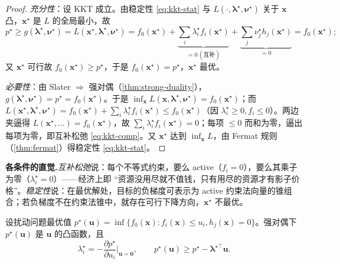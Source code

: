 \begin{proof}
\emph{充分性}：设 KKT 成立。由稳定性 \cref{eq:kkt-stat} 与 $L(\cdot,\boldsymbol\lambda^\star,\boldsymbol\nu^\star)$ 关于 $\mathbf x$ 凸，$\mathbf x^\star$ 是 $L$ 的全局最小，故
\[
  p^\star\ge g(\boldsymbol\lambda^\star,\boldsymbol\nu^\star)=L(\mathbf x^\star,\boldsymbol\lambda^\star,\boldsymbol\nu^\star)=f_0(\mathbf x^\star)+\underbrace{\textstyle\sum_i\lambda_i^\star f_i(\mathbf x^\star)}_{=0\,(\text{互补})}+\underbrace{\textstyle\sum_j\nu_j^\star h_j(\mathbf x^\star)}_{=0}=f_0(\mathbf x^\star);
\]
又 $\mathbf x^\star$ 可行故 $f_0(\mathbf x^\star)\ge p^\star$，于是 $f_0(\mathbf x^\star)=p^\star$，$\mathbf x^\star$ 最优。

\emph{必要性}：由 Slater $\Rightarrow$ 强对偶（\cref{thm:strong-duality}），$g(\boldsymbol\lambda^\star,\boldsymbol\nu^\star)=p^\star=f_0(\mathbf x^\star)$。于是 $\inf_{\mathbf x}L(\mathbf x,\boldsymbol\lambda^\star,\boldsymbol\nu^\star)=f_0(\mathbf x^\star)$；而 $L(\mathbf x^\star,\boldsymbol\lambda^\star,\boldsymbol\nu^\star)=f_0(\mathbf x^\star)+\sum_i\lambda_i^\star f_i(\mathbf x^\star)\le f_0(\mathbf x^\star)$（因 $\lambda_i^\star\ge0,f_i\le0$）。两边夹逼得 $L(\mathbf x^\star,\dots)=f_0(\mathbf x^\star)$，故 $\sum_i\lambda_i^\star f_i(\mathbf x^\star)=0$；每项 $\le0$ 而和为零，逼出每项为零，即互补松弛 \cref{eq:kkt-comp}。又 $\mathbf x^\star$ 达到 $\inf_{\mathbf x}L$，由 Fermat 规则（\cref{thm:fermat}）得稳定性 \cref{eq:kkt-stat}。
\end{proof}

\noindent\textbf{各条件的直觉.}\;\emph{互补松弛}说：每个不等式约束，要么 active（$f_i=0$），要么其乘子为零（$\lambda_i^\star=0$）——经济上即 “资源没用尽就不值钱，只有用尽的资源才有影子价格”。\emph{稳定性}说：在最优解处，目标的负梯度可表示为 active 约束法向量的锥组合；若负梯度不在约束法锥中，就存在可行下降方向，$\mathbf x^\star$ 不最优。

\begin{theorem}\label{thm:sensitivity}
设扰动问题最优值 $p^\star(\mathbf u)=\inf\{f_0(\mathbf x):f_i(\mathbf x)\le u_i,h_j(\mathbf x)=0\}$。强对偶下 $p^\star(\mathbf u)$ 是 $\mathbf u$ 的凸函数，且
\begin{equation}
  \lambda_i^\star=-\frac{\partial p^\star}{\partial u_i}\Big|_{\mathbf u=\mathbf 0},\qquad p^\star(\mathbf u)\ge p^\star-\boldsymbol\lambda^{\star\top}\mathbf u.
  \label{eq:sensitivity}
\end{equation}
\end{theorem}

